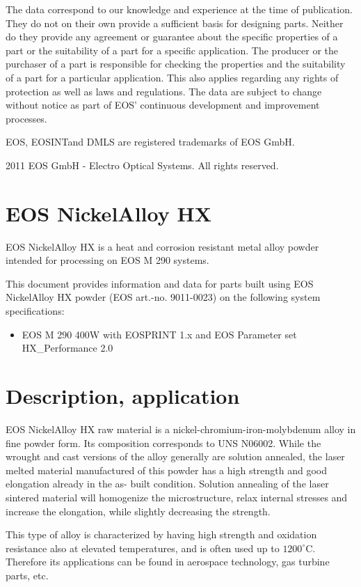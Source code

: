 \documentclass[10pt]{article}
\begin{document}
The data correspond to our knowledge and experience at the time of publication. They do not on their own provide a sufficient basis for designing parts. Neither do they provide any agreement or guarantee about the specific properties of a part or the suitability of a part for a specific application. The producer or the purchaser of a part is responsible for checking the properties and the suitability of a part for a particular application. This also applies regarding any rights of protection as well as laws and regulations. The data are subject to change without notice as part of EOS' continuous development and improvement processes.

EOS, EOSINTand DMLS are registered trademarks of EOS GmbH.

2011 EOS GmbH - Electro Optical Systems. All rights reserved.

\section*{EOS NickelAlloy HX}
EOS NickelAlloy HX is a heat and corrosion resistant metal alloy powder intended for processing on EOS M 290 systems.

This document provides information and data for parts built using EOS NickelAlloy HX powder (EOS art.-no. 9011-0023) on the following system specifications:

\begin{itemize}
  \item EOS M 290 400W with EOSPRINT 1.x and EOS Parameter set HX\_Performance 2.0
\end{itemize}

\section*{Description, application}
EOS NickelAlloy HX raw material is a nickel-chromium-iron-molybdenum alloy in fine powder form. Its composition corresponds to UNS N06002. While the wrought and cast versions of the alloy generally are solution annealed, the laser melted material manufactured of this powder has a high strength and good elongation already in the as- built condition. Solution annealing of the laser sintered material will homogenize the microstructure, relax internal stresses and increase the elongation, while slightly decreasing the strength.

This type of alloy is characterized by having high strength and oxidation resistance also at elevated temperatures, and is often used up to $1200^{\circ} \mathrm{C}$. Therefore its applications can be found in aerospace technology, gas turbine parts, etc.
\end{document}
